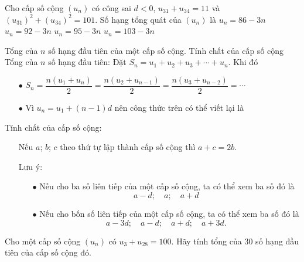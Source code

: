 \begin{ex}%
	Cho cấp số cộng $(u_n)$ có công sai $d<0$, $u_{31}+u_{34}=11$ và $(u_{31})^2 + (u_{34})^2=101$. Số hạng tổng quát của $(u_n)$ là
	\choice
	{$u_{n}=86-3n$}
	{$u_{n}=92-3n$}
	{$u_{n}=95-3n$}
	{\True $u_{n}=103-3n$}
\end{ex}
\begin{dang}{Tổng của $n$ số hạng đầu tiên của một cấp số cộng. Tính chất của cấp số cộng}
	Tổng của $n$ số hạng đầu tiên:	Đặt ${{S}_{n}}={{u}_{1}}+{{u}_{2}}+{{u}_{3}}+\cdots+{{u}_{n}}.$ Khi đó
	\begin{itemize}
		\item [$\bullet$] ${{S}_{n}}=\dfrac{n\left( {{u}_{1}}+{{u}_{n}} \right)}{2}=\dfrac{n\left( {{u}_{2}}+{{u}_{n-1}} \right)}{2}=\dfrac{n\left( {{u}_{3}}+{{u}_{n-2}} \right)}{2}=\cdots$
		\item [$\bullet$] Vì ${{u}_{n}}={{u}_{1}}+\left( n-1 \right)d$ nên công thức trên có thể viết lại là 
	\end{itemize}
	Tính chất của cấp số cộng:
	\begin{itemize}
		\item [\ding{172}] Nếu $a$; $b$; $c$ theo thứ tự lập thành cấp số cộng thì $a+c=2b$.
		\item [\ding{173}] Lưu ý:
		\begin{itemize}
			\item [$\bullet$] Nếu cho ba số liên tiếp của một cấp số cộng, ta có thể xem ba số đó là $$a-d;\quad a; \quad a+d$$
			\item [$\bullet$] Nếu cho bốn số liên tiếp của một cấp số cộng, ta có thể xem ba số đó là $$a-3d;\quad a-d; \quad a+d; \quad a+3d.$$
		\end{itemize}
	\end{itemize}
\end{dang}
\viduminhhoa
\begin{vd}
	Cho một cấp số cộng $(u_n)$ có $u_3 + u_{28} = 100$. Hãy tính tổng của $30$ số hạng đầu tiên của cấp số cộng đó.
\end{vd}

